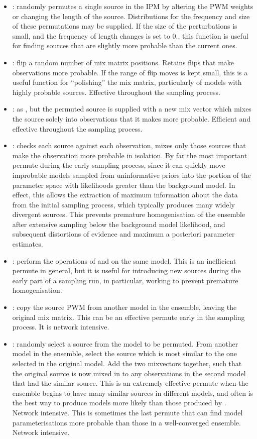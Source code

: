 \documentclass{ut-thesis}
\begin{document}
\begin{NoHyper}
\begin{itemize}
    \item {}: randomly permutes a single source in the IPM by altering the PWM weights or changing the length of the source. Distributions for the frequency and size of these permutations may be supplied. If the size of the perturbations is small, and the frequency of length changes is set to 0., this function is useful for finding sources that are slightly more probable than the current ones.
    \item {}: flip a random number of mix matrix positions. Retains flips that make observations more probable. If the range of flip moves is kept small, this is a useful function for ``polishing'' the mix matrix, particularly of models with highly probable sources. Effective throughout the sampling process.
    \item {}: as , but the permuted source is supplied with a new mix vector which mixes the source solely into observations that it makes more probable. Efficient and effective throughout the sampling process.
    \item {}: checks each source against each observation, mixes only those sources that make the observation more probable in isolation. By far the most important permute during the early sampling process, since it can quickly move improbable models sampled from uninformative priors into the portion of the parameter space with likelihoods greater than the background model. In effect, this allows the extraction of maximum information about the data from the initial sampling process, which typically produces many widely divergent sources. This prevents premature homogenisation of the ensemble after extensive sampling below the background model likelihood, and subsequent distortions of evidence and maximum a posteriori parameter estimates.
    \item {}: perform the operations of  and  on the same model. This is an inefficient permute in general, but it is useful for introducing new sources during the early part of a sampling run, in particular, working to prevent premature homogenisation.
    \item {}: copy the source PWM from another model in the ensemble, leaving the original mix matrix. This can be an effective permute early in the sampling process. It is network intensive.
    \item {}: randomly select a source from the model to be permuted. From another model in the ensemble, select the source which is most similar to the one selected in the original model. Add the two mixvectors together, such that the original source is now mixed in to any observations in the second model that had the similar source. This is an extremely effective permute when the ensemble begins to have many similar sources in different models, and often is the best way to produce models more likely than those produced by . Network intensive. This is sometimes the last permute that can find model parameterisations more probable than those in a well-converged ensemble. Network intensive.

\end{itemize}
\end{NoHyper}
\end{document}
